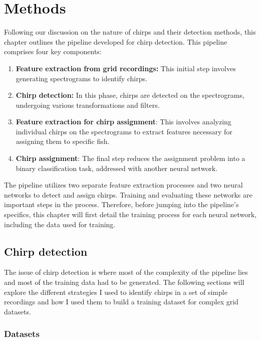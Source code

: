\chapter{Methods} %
\label{chap:methods}

Following our discussion on the nature of chirps and their detection methods,
this chapter outlines the pipeline developed for chirp detection. This pipeline
comprises four key components: 

\begin{enumerate}
  \item \textbf{Feature extraction from grid recordings:} This 
        initial step involves generating spectrograms to identify chirps.
  \item \textbf{Chirp detection:} In this phase, chirps are detected on the
        spectrograms, undergoing various transformations and filters.
  \item \textbf{Feature extraction for chirp assignment}: This involves
        analyzing individual chirps on the spectrograms to extract features
        necessary for assigning them to specific fish.
  \item \textbf{Chirp assignment}: The final step reduces the assignment
        problem into a binary classification task, addressed with another
        neural network.
\end{enumerate}

The pipeline utilizes two separate feature extraction processes and two neural
networks to detect and assign chirps. Training and evaluating these networks
are important steps in the process. Therefore, before jumping into the
pipeline's specifics, this chapter will first detail the training process for
each neural network, including the data used for training.

\section{Chirp detection}
\label{sec:cpd}

The issue of chirp detection is where most of the complexity of the pipeline
lies and most of the training data had to be generated. The following sections
will explore the different strategies I used to identify chirps in a set of
simple recordings and how I used them to build a training dataset for complex
grid datasets.

\subsection{Datasets}
\label{sec:rawdata}

